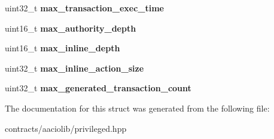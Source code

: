 \begin{DoxyCompactItemize}
uint32\+\_\+t {\bfseries max\+\_\+transaction\+\_\+exec\+\_\+time}
\item 
\mbox{\label{structaacio_1_1blockchain__parameters_a7933f8a43686404e7c9141a3b4c24331}} 
uint16\+\_\+t {\bfseries max\+\_\+authority\+\_\+depth}
\item 
\mbox{\label{structaacio_1_1blockchain__parameters_a1b54fc8e83dc5650da5b253221d0f51f}} 
uint16\+\_\+t {\bfseries max\+\_\+inline\+\_\+depth}
\item 
\mbox{\label{structaacio_1_1blockchain__parameters_aedf39003d433aeff8d4b75ae141a585d}} 
uint32\+\_\+t {\bfseries max\+\_\+inline\+\_\+action\+\_\+size}
\item 
\mbox{\label{structaacio_1_1blockchain__parameters_a34e984395e0e7077a865cbadd4c162f4}} 
uint32\+\_\+t {\bfseries max\+\_\+generated\+\_\+transaction\+\_\+count}
\end{DoxyCompactItemize}


The documentation for this struct was generated from the following file\+:\begin{DoxyCompactItemize}
\item 
contracts/aaciolib/privileged.\+hpp\end{DoxyCompactItemize}
